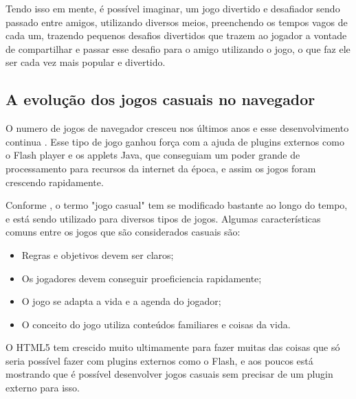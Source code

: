 Tendo isso em mente, é possível imaginar, um jogo divertido e desafiador
sendo passado entre amigos, utilizando diversos meios, preenchendo os
tempos vagos de cada um, trazendo pequenos desafios divertidos que
trazem ao jogador a vontade de compartilhar e passar esse desafio para
o amigo utilizando o jogo, o que faz ele ser cada vez mais popular e
divertido.

\subsection{A evolução dos jogos casuais no navegador}

O numero de jogos de navegador cresceu nos últimos anos e esse
desenvolvimento continua \cite{ozcan2010recent}. Esse tipo de jogo
ganhou força com a ajuda de plugins externos como o Flash player e
os applets Java, que conseguiam um poder grande de processamento para
recursos da internet da época, e assim os jogos foram crescendo rapidamente.

Conforme , o termo "jogo casual" tem se
modificado bastante ao longo do tempo, e está sendo utilizado para
diversos tipos de jogos. Algumas características comuns entre os jogos
que são considerados casuais são:

\begin{itemize}
    \item Regras e objetivos devem ser claros;
    \item Os jogadores devem conseguir proeficiencia rapidamente;
    \item O jogo se adapta a vida e a agenda do jogador;
    \item O conceito do jogo utiliza conteúdos familiares e coisas da vida.
\end{itemize}

O HTML5 tem crescido muito ultimamente para fazer muitas das coisas
que só seria possível fazer com plugins externos como o Flash, e aos
poucos está mostrando que é possível desenvolver jogos casuais sem
precisar de um plugin externo para isso.
